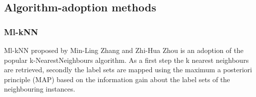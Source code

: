 \subsection{Algorithm-adoption methods}
\subsubsection{Ml-kNN}
Ml-kNN proposed by Min-Ling Zhang and Zhi-Hua Zhou\cite{Zhang07} is an adoption of the popular k-NearestNeighbours algorithm. As a first step the k nearest neighbours are retrieved, secondly the label sets are mapped using the maximum a posteriori principle (MAP) based on the information gain about the label sets of the neighbouring instances.